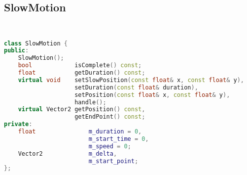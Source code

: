 \subsection{SlowMotion}
\begin{lstlisting}[language=C++]


class SlowMotion {
public:
    SlowMotion();
    bool            isComplete() const;
    float           getDuration() const;
    virtual void    setSlowPosition(const float& x, const float& y),
                    setDuration(const float& duration),
                    setPosition(const float& x, const float& y),
                    handle();
    virtual Vector2 getPosition() const,
                    getEndPoint() const;
private:
    float               m_duration = 0,
                        m_start_time = 0,
                        m_speed = 0;
    Vector2             m_delta,
                        m_start_point;
};





\end{lstlisting}
